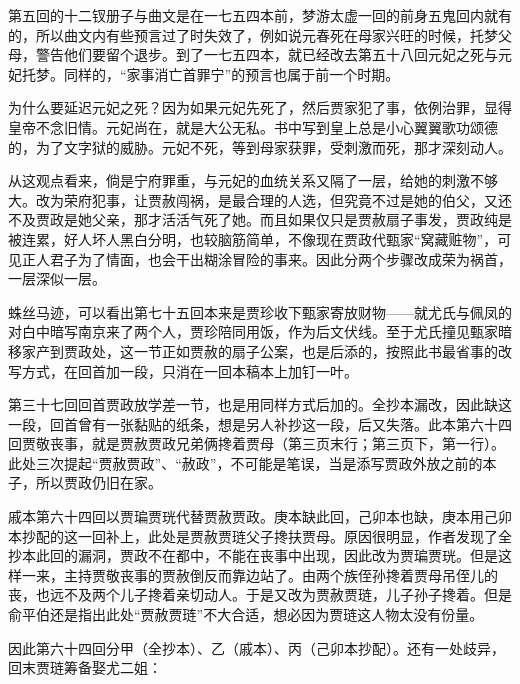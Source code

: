 \par 第五回的十二钗册子与曲文是在一七五四本前，梦游太虚一回的前身五鬼回内就有的，所以曲文内有些预言过了时失效了，例如说元春死在母家兴旺的时候，托梦父母，警告他们要留个退步。到了一七五四本，就已经改去第五十八回元妃之死与元妃托梦。同样的，“家事消亡首罪宁”的预言也属于前一个时期。
\par 为什么要延迟元妃之死？因为如果元妃先死了，然后贾家犯了事，依例治罪，显得皇帝不念旧情。元妃尚在，就是大公无私。书中写到皇上总是小心翼翼歌功颂德的，为了文字狱的威胁。元妃不死，等到母家获罪，受刺激而死，那才深刻动人。
\par 从这观点看来，倘是宁府罪重，与元妃的血统关系又隔了一层，给她的刺激不够大。改为荣府犯事，让贾赦闯祸，是最合理的人选，但究竟不过是她的伯父，又还不及贾政是她父亲，那才活活气死了她。而且如果仅只是贾赦扇子事发，贾政纯是被连累，好人坏人黑白分明，也较脑筋简单，不像现在贾政代甄家“窝藏赃物”，可见正人君子为了情面，也会干出糊涂冒险的事来。因此分两个步骤改成荣为祸首，一层深似一层。
\par 蛛丝马迹，可以看出第七十五回本来是贾珍收下甄家寄放财物——就尤氏与佩凤的对白中暗写南京来了两个人，贾珍陪同用饭，作为后文伏线。至于尤氏撞见甄家暗移家产到贾政处，这一节正如贾赦的扇子公案，也是后添的，按照此书最省事的改写方式，在回首加一段，只消在一回本稿本上加钉一叶。
\par 第三十七回回首贾政放学差一节，也是用同样方式后加的。全抄本漏改，因此缺这一段，回首曾有一张黏贴的纸条，想是另人补抄这一段，后又失落。此本第六十四回贾敬丧事，就是贾赦贾政兄弟俩搀着贾母（第三页末行；第三页下，第一行）。此处三次提起“贾赦贾政”、“赦政”，不可能是笔误，当是添写贾政外放之前的本子，所以贾政仍旧在家。
\par 戚本第六十四回以贾㻞贾珖代替贾赦贾政。庚本缺此回，己卯本也缺，庚本用己卯本抄配的这一回补上，此处是贾赦贾琏父子搀扶贾母。原因很明显，作者发现了全抄本此回的漏洞，贾政不在都中，不能在丧事中出现，因此改为贾㻞贾珖。但是这样一来，主持贾敬丧事的贾赦倒反而靠边站了。由两个族侄孙搀着贾母吊侄儿的丧，也远不及两个儿子搀着亲切动人。于是又改为贾赦贾琏，儿子孙子搀着。但是俞平伯还是指出此处“贾赦贾琏”不大合适，想必因为贾琏这人物太没有份量。
\par 因此第六十四回分甲（全抄本）、乙（戚本）、丙（己卯本抄配）。还有一处歧异，回末贾琏筹备娶尤二姐：
